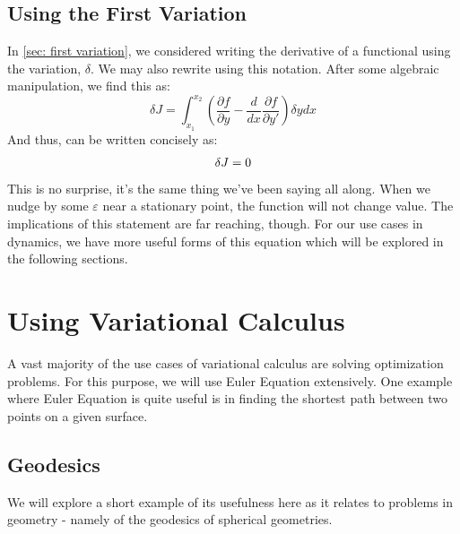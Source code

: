 \subsection{Using the First Variation}
In \autoref{sec: first variation}, we considered writing the derivative of a functional using the variation, $\delta$. We may also rewrite  using this notation. After some algebraic manipulation, we find this as:
\begin{equation}
    \delta J= \int_{x_1}^{x_2}\left(\frac{\partial f}{\partial y}-\frac{d}{dx}\frac{\partial f}{\partial y'}\right)\delta y{dx}
\end{equation}
And thus,  can be written concisely as:
\begin{equation}
    {\color{black}\delta J=0}
\end{equation}
This is no surprise, it's the same thing we've been saying all along. When we nudge by some $\varepsilon$ near a stationary point, the function will not change value. The implications of this statement are far reaching, though. For our use cases in dynamics, we have more useful forms of this equation which will be explored in the following sections.

\section{Using Variational Calculus}
A vast majority of the use cases of variational calculus are solving optimization problems. For this purpose, we will use \gls{Euler Equation} extensively. One example where \gls{Euler Equation} is quite useful is in finding the shortest path between two points on a given surface.

\subsection{Geodesics}
We will explore a short example of its usefulness here as it relates to problems in geometry - namely of the \glspl{geodesic} of spherical geometries.

